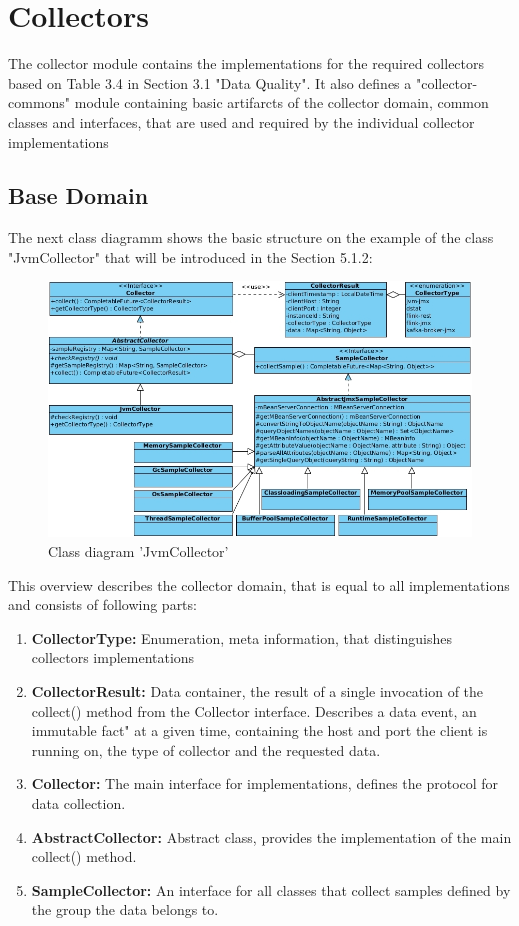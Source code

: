 \section{Collectors}

The collector module contains the implementations for the required collectors based on Table 3.4 in
Section 3.1 "Data Quality". It also defines a "collector-commons" module containing basic artifarcts
of the collector domain, common classes and interfaces, that are used and required by the individual
collector implementations

\subsection{Base Domain}

The next class diagramm shows the basic structure on the example of the class "JvmCollector" that will be introduced in
the Section 5.1.2:
\begin{figure}[H]
	\centering
	\includegraphics[width=1.0\textwidth]{../uml/class-jvm-collector.jpg}
	\caption{Class diagram 'JvmCollector'}
	\label{class-diagram-jvm-collector}
\end{figure}

This overview describes the collector domain, that is equal to all implementations and consists of following parts:
\begin{enumerate}
    \item \textbf{CollectorType:}
    Enumeration, meta information, that distinguishes collectors implementations
    \item \textbf{CollectorResult:} Data container, the result of a single invocation of the collect() method from
    the Collector interface. Describes a data event, an immutable fact" at a given time, containing the host and port
    the client is running on, the type of collector and the requested data.
    \item \textbf{Collector:} The main interface for implementations, defines the protocol for data collection.
    \item \textbf{AbstractCollector:} Abstract class, provides the implementation of the main collect() method.
    \item \textbf{SampleCollector:} An interface for all classes that collect samples defined by the group the data
    belongs to.
\end{enumerate}

